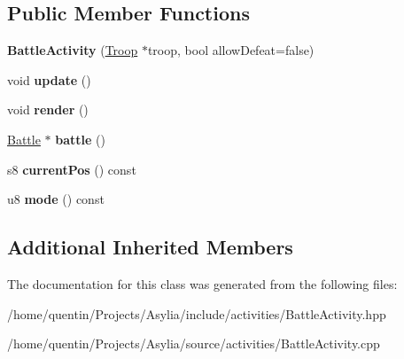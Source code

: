 \subsection*{Public Member Functions}
\begin{DoxyCompactItemize}
\item 
\hypertarget{classBattleActivity_ab129ed3685823d9c789fc48e0a097b81}{{\bfseries Battle\-Activity} (\hyperlink{classTroop}{Troop} $\ast$troop, bool allow\-Defeat=false)}\label{classBattleActivity_ab129ed3685823d9c789fc48e0a097b81}

\item 
\hypertarget{classBattleActivity_ac04947ecdf5d2fe6da8f0a11c9525379}{void {\bfseries update} ()}\label{classBattleActivity_ac04947ecdf5d2fe6da8f0a11c9525379}

\item 
\hypertarget{classBattleActivity_a64ba166b7d79710c164415454340de8b}{void {\bfseries render} ()}\label{classBattleActivity_a64ba166b7d79710c164415454340de8b}

\item 
\hypertarget{classBattleActivity_adea57ed9fb355bd94b9ec12bc2c3052e}{\hyperlink{classBattle}{Battle} $\ast$ {\bfseries battle} ()}\label{classBattleActivity_adea57ed9fb355bd94b9ec12bc2c3052e}

\item 
\hypertarget{classBattleActivity_a2e82b37fc76a4e7801e0e1b2f28623bb}{s8 {\bfseries current\-Pos} () const }\label{classBattleActivity_a2e82b37fc76a4e7801e0e1b2f28623bb}

\item 
\hypertarget{classBattleActivity_a451a88d0fdb3d4e293e79613bd9cb82e}{u8 {\bfseries mode} () const }\label{classBattleActivity_a451a88d0fdb3d4e293e79613bd9cb82e}

\end{DoxyCompactItemize}
\subsection*{Additional Inherited Members}


The documentation for this class was generated from the following files\-:\begin{DoxyCompactItemize}
\item 
/home/quentin/\-Projects/\-Asylia/include/activities/Battle\-Activity.\-hpp\item 
/home/quentin/\-Projects/\-Asylia/source/activities/Battle\-Activity.\-cpp\end{DoxyCompactItemize}
